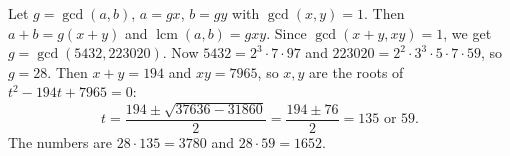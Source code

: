Let $g=\gcd(a,b)$, $a=gx$, $b=gy$ with $\gcd(x,y)=1$. Then $a+b=g(x+y)$ and $\operatorname{lcm}(a,b)=gxy$. Since $\gcd(x+y,xy)=1$, we get $g=\gcd(5432,223020)$. Now $5432=2^3\cdot7\cdot97$ and $223020=2^2\cdot3^3\cdot5\cdot7\cdot59$, so $g=28$. Then $x+y=194$ and $xy=7965$, so $x,y$ are the roots of $t^2-194t+7965=0$:
\[t=\dfrac{194\pm\sqrt{37636-31860}}{2}=\dfrac{194\pm76}{2}=135\text{ or }59.\]
The numbers are $28\cdot135=\boxed{3780}$ and $28\cdot59=\boxed{1652}$.
